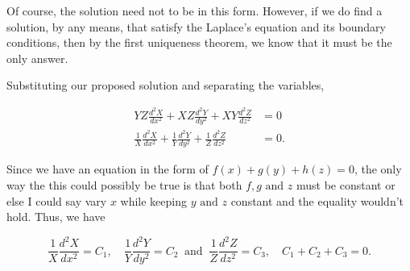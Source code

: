 \documentclass[english,a4paper,12pt]{report}
\begin{document}
Of course, the solution need not to be in this form. However, if we do find a solution, by any means, that satisfy the Laplace's equation and its boundary conditions, then by the first uniqueness theorem, we know that it must be the only answer. 
    
Substituting our proposed solution and separating the variables,
    
\begin{equation}
    \begin{aligned}
        YZ \frac{d^2X}{dx^2} + XZ \frac{d^2Y}{dy^2} + XY \frac{d^2Z}{dz^2} &= 0 \\
        \frac{1}{X} \frac{d^2X}{dx^2} + \frac{1}{Y} \frac{d^2Y}{dy^2} + \frac{1}{Z} \frac{d^2Z}{dz^2} &= 0. 
    \end{aligned}
\end{equation}
    
Since we have an equation in the form of \(f(x) + g(y) + h(z) = 0\), the only way the this could possibly be true is that both  \(f,g \text{ and }  z\) must be constant or else I could say vary \(x\) while keeping \(y \text { and } z\) constant and the equality wouldn't hold. Thus, we have
    
\begin{equation}
    \frac{1}{X} \frac{d^2X}{dx^2} = C_1, \quad \frac{1}{Y} \frac{d^2Y}{dy^2} = C_2 ~ \text{ and } ~ \frac{1}{Z} \frac{d^2Z}{dz^2} = C_3, \quad C_1 + C_2 + C_3 = 0.
\end{equation}
\end{document}

